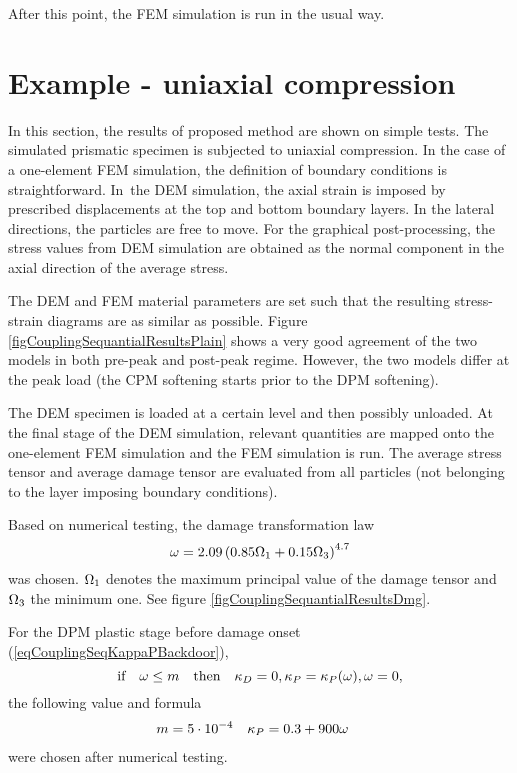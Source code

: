After this point, the FEM simulation is run in the usual way.


\section{Example - uniaxial compression}\label{secCouplingSequentialExamples}
In this section, the results of proposed method are shown on simple  tests.
The simulated prismatic specimen is subjected to uniaxial compression.
In the case of a one-element FEM simulation, the definition of boundary conditions is straightforward.
In~the DEM simulation, the axial strain is imposed by prescribed displacements at the top and bottom boundary layers.
In the lateral directions, the particles are free to move.
For the graphical post-processing, the stress values from DEM simulation are obtained as the normal component in the axial direction of the average stress.

The DEM and FEM material parameters are set such that the resulting stress-strain diagrams are as similar as possible.
Figure \ref{figCouplingSequantialResultsPlain} shows a very good agreement of the two models in both pre-peak and post-peak regime.
However, the two models differ at the peak load (the CPM softening starts prior to the DPM softening).

The DEM specimen is loaded at a certain level and then possibly unloaded.
At the final stage of the DEM simulation, relevant quantities are mapped onto the one-element FEM simulation and the FEM simulation is run.
The average stress tensor and average damage tensor are evaluated from all  particles (not belonging to the layer imposing boundary conditions).

Based on numerical testing, the damage transformation law
\begin{equation}
	\omega = 2{.}09\left(0{.}85\Omega_1+0{.}15\Omega_3\right)^{4{.}7}
	\label{eqCouplingSeqDmgTransformation}
\end{equation}
was chosen.
$\Omega_1$ denotes the maximum principal value of the damage tensor and $\Omega_3$ the minimum one.
See figure \ref{figCouplingSequantialResultsDmg}.

For the DPM plastic stage before damage onset (\ref{eqCouplingSeqKappaPBackdoor}),
\begin{equation}
	\text{if}\quad \omega \le m \quad \text{then}\quad \kappa_D = 0, \kappa_P = \kappa_P(\omega), \omega = 0
	,
\end{equation}
the following value and formula
\begin{align}
	m &= 5\cdot10^{-4}
	&
	\kappa_P &= 0{.}3 + 900\omega
\end{align}
were chosen after numerical testing.

